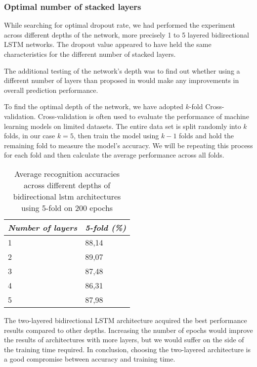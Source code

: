 \subsubsection{Optimal number of stacked layers}

While searching for optimal dropout rate, we had performed the experiment across different depths of the network, more precisely 1 to 5 layered bidirectional LSTM networks. The dropout value appeared to have held the same characteristics for the different number of stacked layers.

The additional testing of the network's depth was to find out whether using a different number of layers than proposed in \cite{bidirect_dynam} would make any improvements in overall prediction performance.

To find the optimal depth of the network, we have adopted $k$-fold Cross-validation. Cross-validation is often used to evaluate the performance of machine learning models on limited datasets. The entire data set is split randomly into $k$ folds, in our case $k=5$, then train the model using $k-1$ folds and hold the remaining fold to measure the model's accuracy. We will be repeating this process for each fold and then calculate the average performance across all folds.

\begin{table}[ht]
    \centering
    \caption{Average recognition accuracies across different depths of bidirectional lstm architectures using 5-fold on 200 epochs}
    \begin{tabular}{ | p{4.5cm}| p{4.5cm} |} 
        \hline
        \hfil \textit{Number of layers}
        & \hfil \textit{5-fold (\%)}\\
        \hline\hline
        \hfil 1                 & \hfil 88,14           \\
        \hline
        \hfil 2                 & \hfil 89,07       \\
        \hline
        \hfil 3                 & \hfil 87,48       \\
        \hline
        \hfil 4                 & \hfil 86,31       \\
        \hline
        \hfil 5                 & \hfil 87,98       \\
        \hline
    \end{tabular}
    \label{tab:HT_results_table}
\end{table}

The two-layered bidirectional LSTM architecture acquired the best performance results compared to other depths. Increasing the number of epochs would improve the results of architectures with more layers, but we would suffer on the side of the training time required. In conclusion, choosing the two-layered architecture is a good compromise between accuracy and training time.

